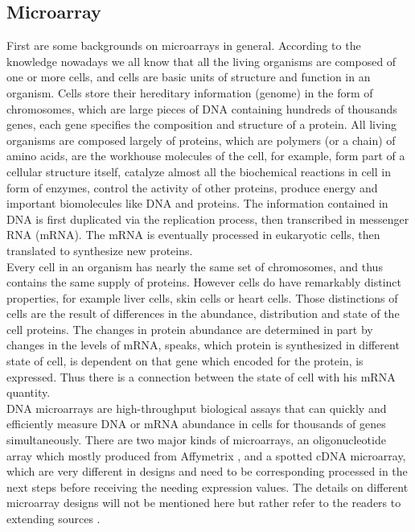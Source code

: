 \subsection{Microarray}
First are some backgrounds on microarrays in general. According to the knowledge nowadays we all know that all the living organisms are composed of one or more cells, and cells are basic units of structure and function in an organism. Cells store their hereditary information (genome) in the form of chromosomes, which are large pieces of DNA containing hundreds of thousands genes, each gene specifies the composition and structure of a protein. All living organisms are composed largely of proteins, which are polymers (or a chain) of amino acids, are the workhouse molecules of the cell, for example, form part of a cellular structure itself, catalyze almost all the biochemical reactions in cell in form of enzymes, control the activity of other proteins, produce energy and important biomolecules like DNA and proteins. The information contained in DNA is first duplicated via the replication process, then transcribed in messenger RNA (mRNA). The mRNA is eventually processed in eukaryotic cells, then translated to synthesize new proteins.
\\
Every cell in an organism has nearly the same set of chromosomes, and thus contains the same supply of proteins. However cells do have remarkably distinct properties, for example liver cells, skin cells or heart cells. Those distinctions of cells are the result of differences in the abundance, distribution and state of the cell proteins. The changes in protein abundance are determined in part by changes in the levels of mRNA, speaks, which protein is synthesized in different state of cell, is dependent on that gene which encoded for the protein, is expressed. Thus there is a connection between the state of cell with his mRNA quantity. 
\\
DNA microarrays are high-throughput biological assays that can quickly and efficiently measure DNA or mRNA abundance in cells for thousands of genes simultaneously. There are two major kinds of microarrays, an oligonucleotide array which mostly produced from Affymetrix \citep{wiki:affy}, and a spotted cDNA microarray, which are very different in designs and need to be corresponding processed in the next steps before receiving the needing expression values. The details on different microarray designs will not be mentioned here but rather refer to the readers to extending sources \citep{wiki:microarray}.
\\
